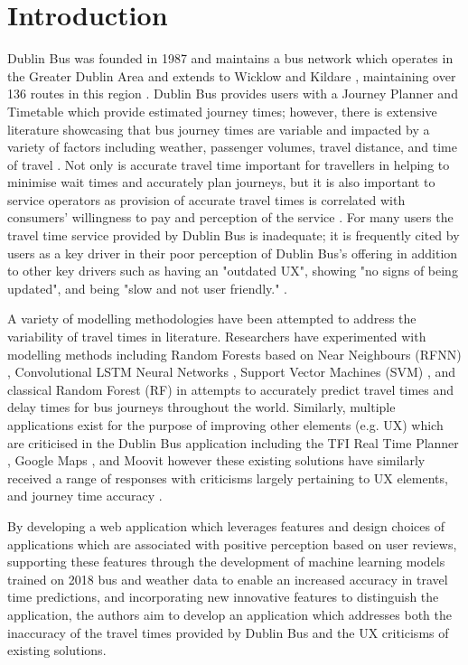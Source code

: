 \documentclass[]{UCD_CS_47360_Report}
\begin{document}
\chapter{Introduction}

Dublin Bus was founded in 1987 and maintains a bus network which operates in the Greater Dublin Area and extends to Wicklow and Kildare \cite{DublinBus-About}, maintaining over 136 routes in this region \cite{TFI-BusTravel}. Dublin Bus provides users with a Journey Planner \cite{DublinBus-JourneyPlanner} and Timetable \cite{DublinBus-Schedule} which provide estimated journey times; however, there is extensive literature showcasing that bus journey times are variable and impacted by a variety of factors including weather, passenger volumes, travel distance, and time of travel \cite{Diab:2013}. Not only is accurate travel time important for travellers in helping to minimise wait times and accurately plan journeys, but it is also important to service operators as provision of accurate travel times is correlated with consumers' willingness to pay and perception of the service \cite{Zheng:2010}. For many users the travel time service provided by Dublin Bus is inadequate; it is frequently cited by users as a key driver in their poor perception of Dublin Bus's offering in addition to other key drivers such as having an "outdated UX", showing "no signs of being updated", and being "slow and not user friendly." \cite{DublinBus-Reviews} \cite{DublinBus-Reviews-2} \cite{DublinBus-Reviews-3}. 

A variety of modelling methodologies have been attempted to address the variability of travel times in literature. Researchers have experimented with modelling methods including Random Forests based on Near Neighbours (RFNN) \cite{Yu:2018}, Convolutional LSTM Neural Networks \cite{Petersen_2019}, Support Vector Machines (SVM) \cite{SVM}, and classical Random Forest (RF) \cite{RF} in attempts to accurately predict travel times and delay times for bus journeys throughout the world. Similarly, multiple applications exist for the purpose of improving other elements (e.g. UX) which are criticised in the Dublin Bus application including the TFI Real Time Planner \cite{TFI-App}, Google Maps \cite{GoogleMaps-App}, and Moovit \cite{Moovit-App} however these existing solutions have similarly received a range of responses with criticisms largely pertaining to UX elements, and journey time accuracy \cite{TFI-Review} \cite{GoogleMaps-Review} \cite{Moovit-Review}.

By developing a web application which leverages features and design choices of applications which are associated with positive perception based on user reviews, supporting these features through the development of machine learning models trained on 2018 bus and weather data to enable an increased accuracy in travel time predictions, and incorporating new innovative features to distinguish the application, the authors aim to develop an application which addresses both the inaccuracy of the travel times provided by Dublin Bus and the UX criticisms of existing solutions.
\end{document}
